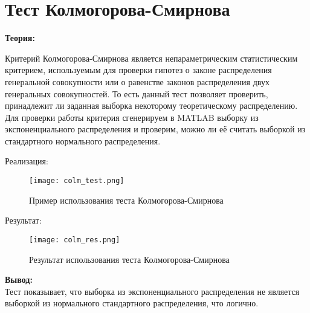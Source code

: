 \chapter{Тест Колмогорова-Смирнова}
\label{ch:сhap5}

\textbf{Теория:}

Критерий Колмогорова-Смирнова является непараметрическим статистическим критерием, используемым для проверки гипотез о законе 
распределения генеральной совокупности или о равенстве законов распределения двух генеральных совокупностей. То есть данный 
тест позволяет проверить, принадлежит ли заданная выборка некоторому теоретическому распределению. \\

Для проверки работы критерия сгенерируем в MATLAB выборку из экспоненциального распределения и проверим, можно ли её считать 
выборкой из стандартного нормального распределения.

Реализация:


\begin{figure}[H]
    \centering
    \texttt{[image: colm\_test.png]}
    \caption{Пример использования теста Колмогорова-Смирнова}
\end{figure}


Результат:

\begin{figure}[H]
    \centering
    \texttt{[image: colm\_res.png]}
    \caption{Результат использования теста Колмогорова-Смирнова}
\end{figure}

\textbf{Вывод:} \\

Тест показывает, что выборка из экспоненциального распределения не является выборкой из нормального стандартного распределения,
что логично.

\endinput